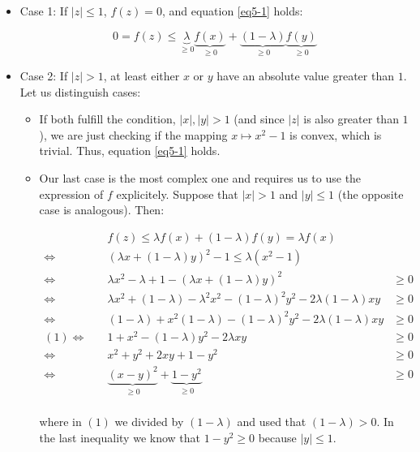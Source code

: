 \documentclass[11pt,table]{article}
\begin{document}
	\begin{itemize}
		\item Case 1: If $|z| \leq 1$, $f(z) = 0$, and equation \ref{eq5-1} holds:
		
		\[
		0 = f(z) \le \underbrace{\lambda}_{\ge 0} \underbrace{f(x)}_{\ge 0} + \underbrace{(1 - \lambda)}_{\ge 0} \underbrace{f(y)}_{\ge 0}
		\]
		
		\item Case 2: If $|z| > 1$, at least either $x$ or $y$ have an absolute value greater than $1$. Let us distinguish cases:
		\begin{itemize}
			\item If both fulfill the condition, $|x|, |y| > 1$ (and since $|z|$ is also greater than $1$), we are just checking if the mapping $x \mapsto x^2 - 1$ is convex, which is trivial. Thus, equation \ref{eq5-1} holds.
			\item Our last case is the most complex one and requires us to use the expression of $f$ explicitely. Suppose that $|x| > 1$ and $|y| \le 1$ (the opposite case is analogous). Then:
			
			\begin{align*}
				& f(z) \le \lambda f(x) + (1 - \lambda) f(y) = \lambda f(x) \\
				\Longleftrightarrow \quad & \left(\lambda x + (1 - \lambda) y\right)^2 - 1 \le \lambda \left(x^2 - 1\right) \\
				\Longleftrightarrow \quad & \lambda x^2 - \lambda + 1 - \left(\lambda x + (1 - \lambda) y\right)^2 & \ge 0 \\
				\Longleftrightarrow \quad & \lambda x^2 + (1 - \lambda) - \lambda^2 x^2 - (1 - \lambda)^2 y^2 - 2\lambda (1 - \lambda) x y & \ge 0\\
				\Longleftrightarrow \quad & (1 - \lambda) + x^2 (1 - \lambda) - (1 - \lambda)^2 y^2 - 2\lambda (1 - \lambda) x y & \ge 0 \\
				(1) \Longleftrightarrow \quad & 1 + x^2 - (1 - \lambda) y^2 - 2\lambda x y & \ge 0 \\
				\Longleftrightarrow \quad & x^2 + y^2 + 2xy + 1 - y^2 & \ge 0 \\
				\Longleftrightarrow \quad & \underbrace{(x - y)^2}_{\ge 0} + \underbrace{1 - y^2}_{\ge 0} & \ge 0\\
			\end{align*}
			
			where in $(1)$ we divided by $(1-\lambda)$ and used that $(1 - \lambda) > 0$. In the last inequality we know that \(1 - y^2 \ge 0\) because \(|y| \le 1\). 
			
		\end{itemize}
	\end{itemize}
	
\end{document}
